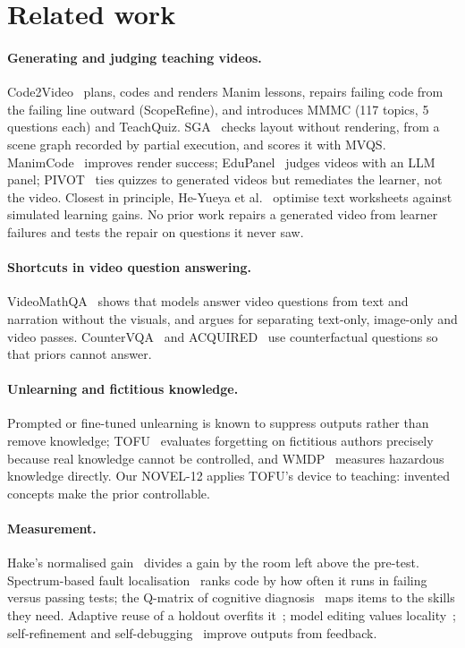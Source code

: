 \section{Related work}

\paragraph{Generating and judging teaching videos.} Code2Video~\cite{code2video} plans, codes and renders Manim lessons,
repairs failing code from the failing line outward (ScopeRefine), and introduces MMMC (117 topics, 5 questions each)
and TeachQuiz. SGA~\cite{sga} checks layout without rendering, from a scene graph recorded by partial execution, and
scores it with MVQS. ManimCode~\cite{manimcode} improves render success; EduPanel~\cite{edupanel} judges videos with an
LLM panel; PIVOT~\cite{pivot} ties quizzes to generated videos but remediates the learner, not the video. Closest in
principle, He-Yueya et al.~\cite{heyueya2024} optimise text worksheets against simulated learning gains. No prior work
repairs a generated video from learner failures and tests the repair on questions it never saw.

\paragraph{Shortcuts in video question answering.} VideoMathQA~\cite{videomathqa} shows that models answer video
questions from text and narration without the visuals, and argues for separating text-only, image-only and video passes.
CounterVQA~\cite{countervqa} and ACQUIRED~\cite{acquired} use counterfactual questions so that priors cannot answer.

\paragraph{Unlearning and fictitious knowledge.} Prompted or fine-tuned unlearning is known to suppress outputs rather
than remove knowledge; TOFU~\cite{tofu} evaluates forgetting on fictitious authors precisely because real knowledge
cannot be controlled, and WMDP~\cite{wmdp} measures hazardous knowledge directly. Our NOVEL-12 applies TOFU's device to
teaching: invented concepts make the prior controllable.

\paragraph{Measurement.} Hake's normalised gain~\cite{hake1998} divides a gain by the room left above the pre-test.
Spectrum-based fault localisation~\cite{tarantula,ochiai} ranks code by how often it runs in failing versus passing
tests; the Q-matrix of cognitive diagnosis~\cite{tatsuoka1983,dina} maps items to the skills they need. Adaptive reuse
of a holdout overfits it~\cite{dwork2015}; model editing values locality~\cite{rome}; self-refinement and
self-debugging~\cite{selfrefine,selfdebug} improve outputs from feedback.
